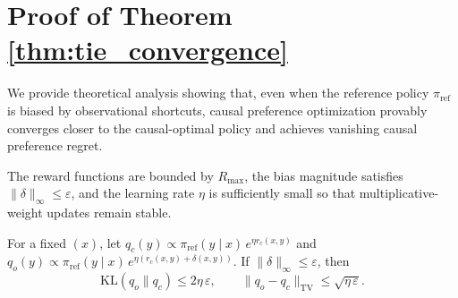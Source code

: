 \section{Proof of Theorem \ref{thm:tie_convergence}}
\label{supp:theory}

\noindent
We provide theoretical analysis showing that, even when the reference policy $\pi_{\text{ref}}$
is biased by observational shortcuts, causal preference optimization provably converges closer to the causal-optimal policy and achieves vanishing causal preference regret.


\begin{assumption}
\label{ass:bounded}
The reward functions are bounded by $R_{\max}$,
the bias magnitude satisfies $\|\delta\|_\infty \le \varepsilon$,
and the learning rate $\eta$ is sufficiently small
so that multiplicative-weight updates remain stable.
\end{assumption}

\begin{lemma}
\label{lem:bias}
For a fixed $(x)$, let
$q_c(y)\propto \pi_{\mathrm{ref}}(y\mid x)\,e^{\eta r_c(x,y)}$
and
$q_o(y)\propto \pi_{\mathrm{ref}}(y\mid x)\,e^{\eta(r_c(x,y)+\delta(x,y))}$.
If $\|\delta\|_\infty\le \varepsilon$, then
\[
\mathrm{KL}(q_o\|q_c) \le 2\eta\,\varepsilon,
\qquad
\|q_o-q_c\|_{\mathrm{TV}} \le \sqrt{\eta\,\varepsilon}.
\]
\end{lemma}

